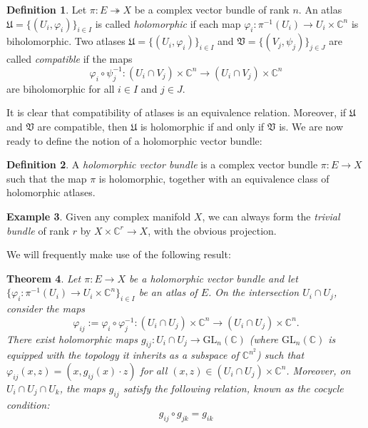 \documentclass[10pt]{amsart}
\numberwithin{equation}{section}
\newcommand{\vp}{\varphi}
\newcommand{\C}{\mathbb{C}}
\newcommand{\epi}{\twoheadrightarrow}
\newcommand{\GL}{\mathrm{GL}}
\theoremstyle{plain}
\newtheorem{thm}{Theorem}[section]
\theoremstyle{definition}
\newtheorem{defn}[thm]{Definition}
\newtheorem{ex}[thm]{Example}
\theoremstyle{remark}
\begin{document}
\begin{defn}\label{defn:1.2}
    Let $\pi: E \epi X$ be a complex vector bundle of rank $n$. An atlas $\mathfrak{U} = \{(U_i, \vp_i)\}_{i \in I}$ is called \emph{holomorphic} if each map $\vp_i: \pi^{-1}(U_i) \to U_i \times \C^n$ is biholomorphic. Two atlases $\mathfrak{U} = \{(U_i, \vp_i)\}_{i \in I}$ and $\mathfrak{V} = \{(V_j, \psi_j)\}_{j \in J}$ are called \emph{compatible} if the maps
    \[\vp_i \circ \psi_j^{-1}: (U_i \cap V_j) \times \C^n \to (U_i \cap V_j) \times \C^n\]
    are biholomorphic for all $i \in I$ and $j \in J$.
\end{defn}

It is clear that compatibility of atlases is an equivalence relation. Moreover, if $\mathfrak{U}$ and $\mathfrak{V}$ are compatible, then $\mathfrak{U}$ is holomorphic if and only if $\mathfrak{V}$ is. We are now ready to define the notion of a holomorphic vector bundle:

\begin{defn}\label{defn:1.3}
    A \emph{holomorphic vector bundle} is a complex vector bundle $\pi: E \to X$ such that the map $\pi$ is holomorphic, together with an equivalence class of holomorphic atlases.
\end{defn}

\begin{ex}
    Given any complex manifold $X$, we can always form the \emph{trivial bundle} of rank $r$ by $X \times \C^r \to X$, with the obvious projection.
\end{ex}

We will frequently make use of the following result:
\begin{thm}\label{thm:1.4}
    Let $\pi: E \to X$ be a holomorphic vector bundle and let $\{\vp_i: \pi^{-1}(U_i) \to U_i \times \C^n \}_{i \in I}$ be an atlas of $E$. On the intersection $U_i \cap U_j$, consider the maps  
    \[\vp_{ij} := \vp_i \circ \vp_j^{-1} : (U_i \cap U_j) \times \C^n \to (U_i \cap U_j) \times \C^n.\]
    There exist holomorphic maps $g_{ij}: U_i \cap U_j \to \GL_n(\C)$ (where $\GL_n(\C)$ is equipped with the topology it inherits as a subspace of $\C^{n^2}$) such that $\vp_{ij}(x, z) = (x, g_{ij}(x)\cdot z)$ for all $(x, z) \in (U_i \cap U_j) \times \C^n$. Moreover, on $U_i \cap U_j \cap U_k$, the maps $g_{ij}$ satisfy the following relation, known as the \emph{cocycle condition}:
    \begin{equation}\label{eq:1.2}
        g_{ij} \circ g_{jk} = g_{ik}
    \end{equation}
\end{thm}
\end{document}
